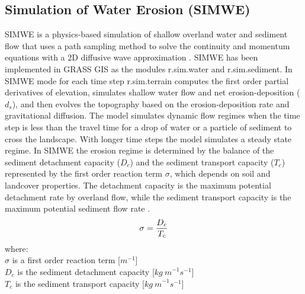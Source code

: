 \documentclass[gmd, manuscript]{copernicus}
\begin{document}
\subsection{Simulation of Water Erosion (SIMWE)} \label{simwe}
SIMWE is a physics-based simulation 
of shallow overland water and sediment flow
that uses a path sampling method to solve the continuity and momentum equations 
with a 2D diffusive wave approximation 
\citep{Mitas1998,Mitasova2004}.
SIMWE has been implemented in GRASS GIS as the modules 
r.sim.water
and r.sim.sediment.
In SIMWE mode 
for each time step
r.sim.terrain
computes the first order partial derivatives of elevation,
simulates shallow water flow and net erosion-deposition ($d_s$),
and then evolves the topography based on 
the erosion-deposition rate and gravitational diffusion.
The model simulates dynamic flow regimes
when the time step is less than the travel time 
for a drop of water or a particle of sediment to cross the landscape.
With longer time steps the model simulates a steady state regime. 
%
In SIMWE the erosion regime is determined by 
the balance of the sediment detachment capacity ($D_c$)
and the sediment transport capacity ($T_c$)
represented by the first order reaction term $\sigma$, 
which depends on soil and landcover properties.
The detachment capacity is the maximum potential 
detachment rate by overland flow, while
the sediment transport capacity 
is the maximum potential sediment flow rate 
\citep{Mitasova2001}.
\begin{equation}
\label{eq:regime}
\sigma = {D_c \over T_c}
\end{equation}
{\small
\noindent
where: \\
\noindent
\hspace*{0.5em} $\sigma$  is a first order reaction term [$\unit{m}^{-1}$]\\
\hspace*{0.5em} $D_c$ is the sediment detachment capacity [$\unit{kg~m}^{-1}s^{-1}$]\\
\hspace*{0.5em} $T_c$ is the sediment transport capacity [$\unit{kg~m}^{-1}s^{-1}$]\\
}



%
% 
% 
%
%
\end{document}
